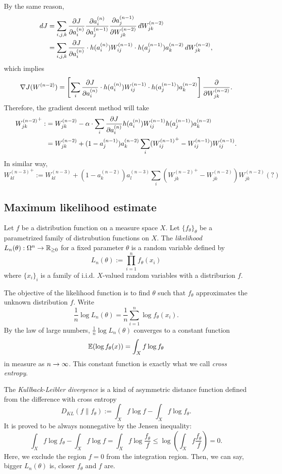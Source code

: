 \documentclass{../exp}
\begin{document}
By the same reason,
\begin{align*}
dJ&=\sum_{i,j,k}\pd{J}{a_i^{(n)}}\pd{a_i^{(n)}}{a_j^{(n-1)}}\pd{a_j^{(n-1)}}{W_{jk}^{(n-2)}}\,dW_{jk}^{(n-2)}\\
&=\sum_{i,j,k}\pd{J}{a_i^{(n)}}\cdot h(a_i^{(n)})W_{ij}^{(n-1)}\cdot h(a_j^{(n-1)})a_k^{(n-2)}\,dW_{jk}^{(n-2)},
\end{align*}
which implies
\[\del J(W^{(n-2)})=\left[\sum_i\pd{J}{a_i^{(n)}}\cdot h(a_i^{(n)})W_{ij}^{(n-1)}\cdot h(a_j^{(n-1)})a_k^{(n-2)}\right]\pd{W_{jk}^{(n-2)}}.\]
Therefore, the gradient descent method will take
\begin{align*}
{W_{jk}^{(n-2)}}^+:&=W_{jk}^{(n-2)}-\alpha\cdot\sum_i\pd{J}{a_i^{(n)}}h(a_i^{(n)})W_{ij}^{(n-1)}h(a_j^{(n-1)})a_k^{(n-2)}\\
&=W_{jk}^{(n-2)}+(1-a_j^{(n-1)})a_k^{(n-2)}\sum_i({W_{ij}^{(n-1)}}^+-W_{ij}^{(n-1)})W_{ij}^{(n-1)}.
\end{align*}
In similar way,
\[{W_{kl}^{(n-3)}}^+:=W_{kl}^{(n-3)}+(1-a_k^{(n-2)})a_l^{(n-3)}\sum_i({W_{jk}^{(n-2)}}^+-W_{jk}^{(n-2)})W_{jk}^{(n-2)}(?)\]




\subsection{Maximum likelihood estimate}
\begin{defn}
Let $f$ be a distribution function on a measure space $X$.
Let $\{f_\theta\}_\theta$ be a parametrized family of distrubution functions on $X$.
The \emph{likelihood} $L_n(\theta):\Omega^n\to\R_{\ge0}$ for a fixed parameter $\theta$ is a random variable defined by
\[L_n(\theta):=\prod_{i=1}^nf_\theta(x_i)\]
where $\{x_i\}_i$ is a family of i.i.d. $X$-valued random variables with a distriburion $f$.
\end{defn}
The objective of the likelihood function is to find $\theta$ such that $f_\theta$ approximates the unknown distribution $f$.
Write
\[\frac1n\log L_n(\theta)=\frac1n\sum_{i=1}^n\log f_\theta(x_i).\]
By the law of large numbers, $\frac1n\log L_n(\theta)$ converges to a constant function
\[\mathbb{E}(\log f_\theta(x))=\int_Xf\log f_\theta\]
in measure as $n\to\oo$.
This constant function is exactly what we call \emph{cross entropy}.

The \emph{Kullback-Leibler divergence} is a kind of asymmetric distance function defined from the difference with cross entropy
\[D_{KL}(f\|f_\theta):=\int_Xf\log f-\int_Xf\log f_\theta.\]
It is proved to be always nonnegative by the Jensen inequality: 
\[\int_Xf\log f_\theta-\int_Xf\log f=\int_Xf\log\frac{f_\theta}f\le\log\left(\int_Xf\frac{f_\theta}f\right)=0.\]
Here, we exclude the region $f=0$ from the integration region.
Then, we can say, bigger $L_n(\theta)$ is, closer $f_\theta$ and $f$ are.
\end{document}
